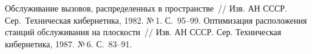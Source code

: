 \begin{multicols}{2}
{\small\frenchspacing
{%
\begin{thebibliography}{9}

Обслуживание вызовов, распределенных в пространстве~//
Изв. АН СССР. Сер.\ Техническая кибернетика, 1982. №\,1. С.~95--99.
Оптимизация расположения станций
обслуживания на плоскости~// Изв. АН СССР. Сер. Техническая кибернетика,
1987. №\,6. С.~83--91.

\end{thebibliography}


\label{end\stat}

}
}

\end{multicols}
